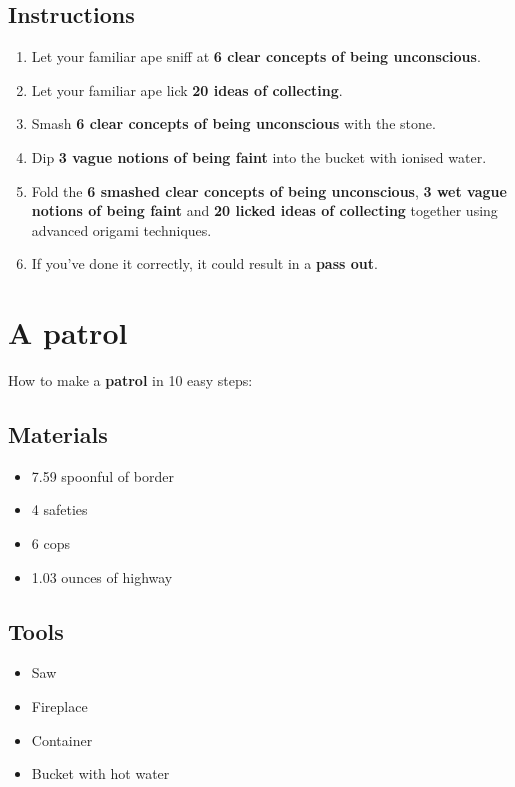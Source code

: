 \documentclass{article}
\begin{document}
\subsection{Instructions}\begin{enumerate}
\item 
Let your familiar ape sniff at \textbf{6 clear concepts of being unconscious}.
\item 
Let your familiar ape lick \textbf{20 ideas of collecting}.
\item 
Smash \textbf{6 clear concepts of being unconscious} with the stone.
\item 
Dip \textbf{3 vague notions of being faint} into the bucket with ionised water.
\item 
Fold the \textbf{6 smashed clear concepts of being unconscious}, \textbf{3 wet vague notions of being faint} and \textbf{20 licked ideas of collecting} together using advanced origami techniques.
\item 
If you've done it correctly, it could result in a \textbf{pass out}.
\end{enumerate}
\newpage
\section{A patrol}How to make a \textbf{patrol} in 10 easy steps:

\subsection{Materials}\begin{itemize}
\item 
7.59 spoonful of border
\item 
4 safeties
\item 
6 cops
\item 
1.03 ounces of highway
\end{itemize}
\subsection{Tools}\begin{itemize}
\item 
Saw
\item 
Fireplace
\item 
Container
\item 
Bucket with hot water
\end{itemize}
\end{document}
